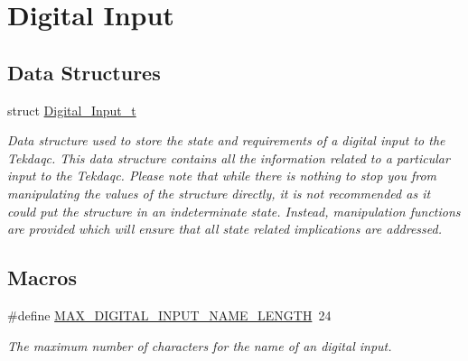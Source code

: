 \hypertarget{group__digital__input}{\section{Digital Input}
\label{group__digital__input}
}
\subsection*{Data Structures}
\begin{DoxyCompactItemize}
\item 
struct \hyperlink{struct_digital___input__t}{Digital\-\_\-\-Input\-\_\-t}
\begin{DoxyCompactList}\small\item\em Data structure used to store the state and requirements of a digital input to the Tekdaqc. This data structure contains all the information related to a particular input to the Tekdaqc. Please note that while there is nothing to stop you from manipulating the values of the structure directly, it is not recommended as it could put the structure in an indeterminate state. Instead, manipulation functions are provided which will ensure that all state related implications are addressed. \end{DoxyCompactList}\end{DoxyCompactItemize}
\subsection*{Macros}
\begin{DoxyCompactItemize}
\item 
\hypertarget{group__digital__input_gaf48b39ba82663f6926d1a02d1e501926}{\#define \hyperlink{group__digital__input_gaf48b39ba82663f6926d1a02d1e501926}{M\-A\-X\-\_\-\-D\-I\-G\-I\-T\-A\-L\-\_\-\-I\-N\-P\-U\-T\-\_\-\-N\-A\-M\-E\-\_\-\-L\-E\-N\-G\-T\-H}~24}\label{group__digital__input_gaf48b39ba82663f6926d1a02d1e501926}

\begin{DoxyCompactList}\small\item\em The maximum number of characters for the name of an digital input. \end{DoxyCompactList}\end{DoxyCompactItemize}
